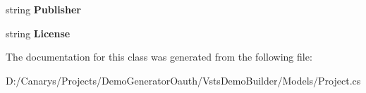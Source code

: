 \begin{DoxyCompactItemize}
\mbox{\label{class_vsts_demo_builder_1_1_models_1_1_required_extensions_1_1_extension_with_link_a456ae1f71768c6c44c38b4c0b0250658}} 
string {\bfseries Publisher}
\item 
\mbox{\label{class_vsts_demo_builder_1_1_models_1_1_required_extensions_1_1_extension_with_link_a542e94f369ac908d86e85953e5ca61c6}} 
string {\bfseries License}
\end{DoxyCompactItemize}


The documentation for this class was generated from the following file\+:\begin{DoxyCompactItemize}
\item 
D\+:/\+Canarys/\+Projects/\+Demo\+Generator\+Oauth/\+Vsts\+Demo\+Builder/\+Models/Project.\+cs\end{DoxyCompactItemize}
